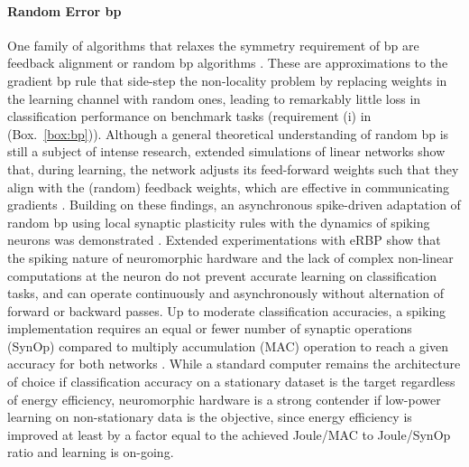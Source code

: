 \documentclass[journal,onecolumn,11pt]{IEEEtran}
\newcommand{\reffig}[1]{{\color{blue!70}(Fig.~\ref{#1})}}
\newcommand{\refbox}[1]{{\color{blue!70}(Box.~\ref{#1})}}
\begin{document}
\paragraph{Random Error \Gls{bp}}
One family of algorithms that relaxes the symmetry requirement of \Gls{bp} are feedback alignment or random \Gls{bp} algorithms \cite{Lillicrap_etal16_randsyna,Baldi_etal16_learmach}. 
These are approximations to the gradient \Gls{bp} rule that side-step the non-locality problem by replacing weights in the learning channel with random ones, leading to remarkably little loss in classification performance on benchmark tasks (requirement (i) in \refbox{box:bp}). 
Although a general theoretical understanding of random \Gls{bp} is still a subject of intense research, extended simulations of linear networks show that, during learning, the network adjusts its feed-forward weights such that they align with the (random) feedback weights, which are effective in communicating gradients \cite{Lillicrap_etal16_randsyna}.
Building on these findings, an asynchronous spike-driven adaptation of random \Gls{bp} using local synaptic plasticity rules with the dynamics of spiking neurons was demonstrated \cite{Neftci_etal17_evenrand}.
Extended experimentations with \Gls{eRBP} show that the spiking nature of neuromorphic hardware and the lack of complex non-linear computations at the neuron do not prevent accurate learning on classification tasks, and can operate continuously and asynchronously without alternation of forward or backward passes.
Up to moderate classification accuracies, a spiking implementation requires an equal or fewer number of synaptic operations (SynOp) compared to multiply accumulation (MAC) operation to reach a given accuracy for both networks \cite{Neftci_etal17_evenrand}.
While a standard computer remains the architecture of choice if classification accuracy on a stationary dataset is the target regardless of energy efficiency, neuromorphic hardware is a strong contender if low-power learning on non-stationary data is the objective, since energy efficiency is improved at least by a factor equal to the achieved Joule/MAC to Joule/SynOp ratio and learning is on-going.
\end{document}
